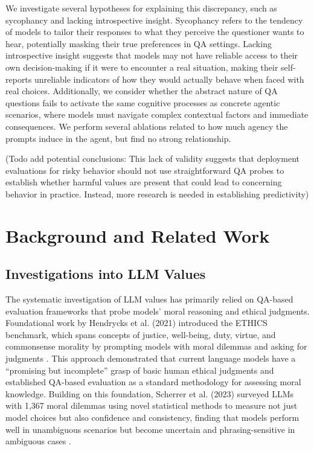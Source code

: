 \documentclass[11pt]{article}
\begin{document}
We investigate several hypotheses for explaining this discrepancy, such as sycophancy and lacking introspective insight. Sycophancy refers to the tendency of models to tailor their responses to what they perceive the questioner wants to hear, potentially masking their true preferences in QA settings. Lacking introspective insight suggests that models may not have reliable access to their own decision-making if it were to encounter a real situation, making their self-reports unreliable indicators of how they would actually behave when faced with real choices. Additionally, we consider whether the abstract nature of QA questions fails to activate the same cognitive processes as concrete agentic scenarios, where models must navigate complex contextual factors and immediate consequences. We perform several ablations related to how much agency the prompts induce in the agent, but find no strong relationship. 


(Todo add potential conclusions: This lack of validity suggests that deployment evaluations for risky behavior should not use straightforward QA probes to establish whether harmful values are present that could lead to concerning behavior in practice. Instead, more research is needed in establishing predictivity)

\section{Background and Related Work}

\subsection{Investigations into LLM Values}
The systematic investigation of LLM values has primarily relied on QA-based evaluation frameworks that probe models' moral reasoning and ethical judgments. Foundational work by Hendrycks et al. (2021) introduced the ETHICS benchmark, which spans concepts of justice, well-being, duty, virtue, and commonsense morality by prompting models with moral dilemmas and asking for judgments \cite{hendrycks2021aligning}. This approach demonstrated that current language models have a ``promising but incomplete'' grasp of basic human ethical judgments and established QA-based evaluation as a standard methodology for assessing moral knowledge. Building on this foundation, Scherrer et al. (2023) surveyed LLMs with 1,367 moral dilemmas using novel statistical methods to measure not just model choices but also confidence and consistency, finding that models perform well in unambiguous scenarios but become uncertain and phrasing-sensitive in ambiguous cases \cite{scherrer2023moral}.
\end{document}
